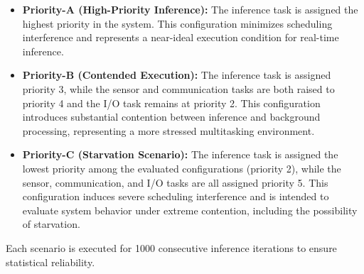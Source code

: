 \documentclass[conference]{IEEEtran}
\begin{document}
\begin{itemize}
    \item \textbf{Priority-A (High-Priority Inference):} The inference task is assigned the highest priority in the system. %
    This configuration minimizes scheduling interference and represents a near-ideal execution condition for real-time inference.

    \item \textbf{Priority-B (Contended Execution):} The inference task is assigned priority 3, while the sensor and communication tasks are both raised to priority 4 and the I/O task remains at priority 2. This configuration introduces substantial contention between inference and background processing, representing a more stressed multitasking environment.

    \item \textbf{Priority-C (Starvation Scenario):} The inference task is assigned the lowest priority among the evaluated configurations (priority 2), while the sensor, communication, and I/O tasks are all assigned priority 5. This configuration induces severe scheduling interference and is intended to evaluate system behavior under extreme contention, including the possibility of starvation.
\end{itemize}

Each scenario is executed for 1000 consecutive inference iterations to ensure statistical reliability.

\end{document}
